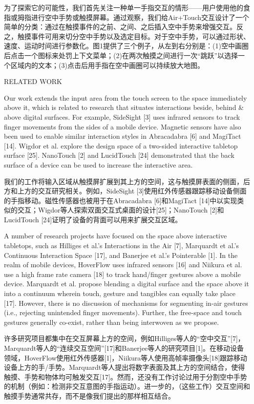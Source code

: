 为了探索它的可能性，我们首先关注一种单一手指交互的情形——用户使用他的食指或拇指进行空中手势或触摸屏幕。通过观察，我们给Air+Touch交互设计了一个简单的分类：通过在触摸事件的之前、之间、之后插入空中手势来增强交互。反之，触摸事件可用来切分空中手势以及选定目标。对于空中手势，可以通过形状、速度、运动时间进行参数化。图1提供了三个例子，从左到右分别是：(1)空中画圈后点击一个图标来处罚上下文菜单；(2)在两次触摸之间进行一次“跳跃”以选择一个区域内的文本；(3)点击后用手指在空中画圈可以持续放大地图。

RELATED WORK

Our work extends the input area from the touch screen to the space immediately above it, which is related to research that situates interactions beside, behind & above digital surfaces. For example, SideSight [3] uses infrared sensors to track finger movements from the sides of a mobile device. Magnetic sensors have also been used to enable similar interaction styles in Abracadabra [6] and MagiTact [14]. Wigdor et al. explore the design space of a two-sided interactive tabletop surface [25]. NanoTouch [2] and LucidTouch [24] demonstrated that the back surface of a device can be used to increase the interactive area.

我们的工作将输入区域从触摸屏扩展到其上方的空间，这与触摸屏表面的侧面，后方和上方的交互研究相关。例如，SideSight [3]使用红外传感器跟踪移动设备侧面的手指移动。磁性传感器也被用于在Abracadabra [6]和MagiTact [14]中以实现类似的交互；Wigdor等人探索双面交互式桌面的设计[25]；NanoTouch [2]和LucidTouch [24]证明了设备的背面可以用来扩展交互区域。

A number of research projects have focused on the space above interactive tabletops, such as Hilliges et al.’s Interactions in the Air [7], Marquardt et al.’s Continuous Interaction Space [17], and Banerjee et al.’s Pointerable [1]. In the realm of mobile devices, HoverFlow uses infrared sensors [16] and Niikura et al. use a high frame rate camera [18] to track hand/finger gestures above a mobile device. Marquardt et al. propose blending a digital surface and the space above it into a continuum wherein touch, gesture and tangibles can equally take place [17]. However, there is no discussion of mechanisms for segmenting in-air gestures (i.e., rejecting unintended finger movements). Further, the free-space and touch gestures generally co-exist, rather than being interwoven as we propose. 

许多研究项目都集中在交互屏幕上方的空间，例如Hilliges等人的“空中交互”[7]，Marquardt等人的“连续交互空间”[17]和Banerjee等人的研究项目[1]。在移动设备领域，HoverFlow使用红外传感器[1]，Niikura等人使用高帧率摄像头[18]跟踪移动设备上方的手/手势。Marquardt等人提出将数字表面及其上方的空间结合，使得触摸、手势和物体均可触发交互[17]。然而，还没有工作讨论过用于分割空中手势的机制（例如：检测非交互意图的手指运动）。进一步的，（这些工作）交互空间和触摸手势通常共存，而不是像我们提出的那样相互结合。

